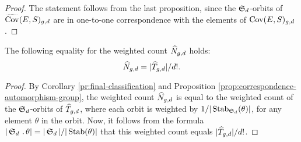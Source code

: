 \begin{proof}
 The statement follows from the last proposition, since the $\operatorname{\mathfrak{S}}_d$-orbits of $\widetilde{\operatorname{Cov}}(E,S)_{g,d}$ are in one-to-one correspondence with the elements of $\operatorname{Cov}(E,S)_{g,d}$.
\end{proof}

\begin{lemma} \label{prop:first-reduction-step}
 The following equality for the weighted count $\widehat{N}_{g,d}$ holds: \[\widehat{N}_{g,d}=|\widehat{T}_{g,d}|/d!.\]
\end{lemma}

\begin{proof}
 By Corollary \ref{pr:final-classification} and Proposition \ref{prop:correspondence-automorphism-group}, the weighted count $\widehat{N}_{g,d}$ is equal to the weighted count of the $\operatorname{\mathfrak{S}}_d$-orbits of $\widehat{T}_{g,d}$, where each orbit is weighted by $1/|\operatorname{Stab}_{\operatorname{\mathfrak{S}}_d}(\theta)|$, for any element $\theta$ in the orbit. Now, it follows from the formula $|\operatorname{\mathfrak{S}}_d\,.\,\theta|=|\operatorname{\mathfrak{S}}_d|/|\operatorname{Stab}(\theta)|$ that this weighted count equals $|\widehat{T}_{g,d}|/d!$.
\end{proof}
